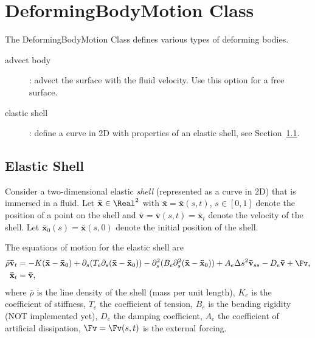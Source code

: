 \newcommand{\rhos}{\bar{\rho}}
\newcommand{\ds}{\Delta s}
\newcommand{\xs}{\bar{x}}
\newcommand{\vs}{\bar{v}}
\newcommand{\xsv}{\mathbf{\xs}}
\newcommand{\vsv}{\mathbf{\vs}}
\section{DeformingBodyMotion Class}\label{sec:deformingBodies}


The DeformingBodyMotion Class defines various types of deforming bodies.


\begin{description}
  \item[advect body]: advect the surface with the fluid velocity. Use this option for a free surface.
  \item[elastic shell]: define a curve in 2D with properties of an elastic shell, see Section~\ref{sec:elasticShell}.
\end{description}


\subsection{Elastic Shell} \label{sec:elasticShell}


Consider a two-dimensional elastic {\em shell} (represented as a curve in 2D) that is immersed in a fluid.
Let $\xsv\in\Real^2$ with $\xsv=\xsv(s,t)$, $s\in[0,1]$  denote the position
of a point on the shell and $\vsv=\vsv(s,t)=\xsv_t$ denote the velocity of the shell. Let $\xsv_0(s)=\xsv(s,0)$ denote the
initial position of the shell. 

The equations of motion for the elastic shell are
\begin{align}
  \rhos \vsv_{t} &= -K (\xsv - \xsv_0) + \partial_s( T_e \partial_s(\xsv - \xsv_0) ) 
                   - \partial_s^2( B_e \partial_s^2 (\xsv-\xsv_0)) 
                   + A_e \ds^2\vsv_{ss} 
                   - D_e \vsv  
                   + \Fv, \label{eq:elasticShell}\\
    \xsv_t & = \vsv, 
\end{align}
where $\rhos$ is the line density of the shell (mass per unit length), 
$K_e$ is the coefficient of stiffness, $T_e$ the coefficient of tension, 
$B_e$ is the bending rigidity (NOT implemented yet), 
$D_e$ the damping coefficient,
$A_e$ the coefficient of artificial dissipation, $\Fv=\Fv(s,t)$ is the external forcing. 

